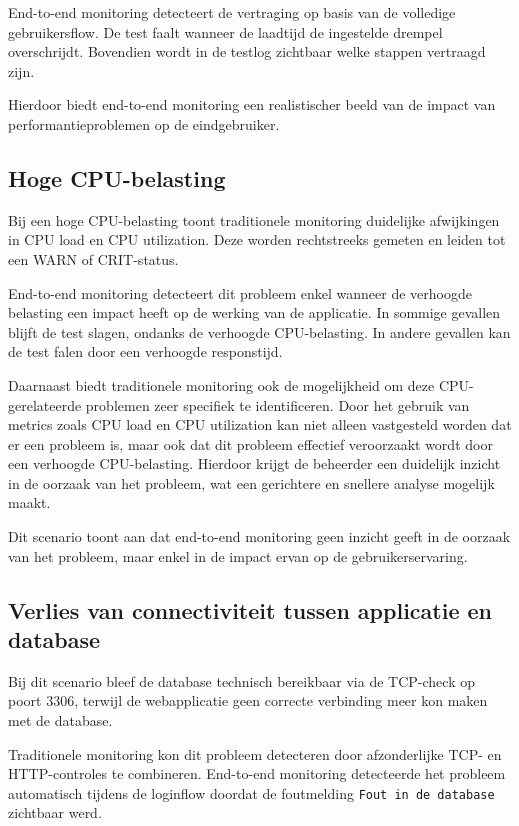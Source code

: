 End-to-end monitoring detecteert de vertraging op basis van de volledige gebruikersflow. De test faalt wanneer de laadtijd de ingestelde drempel overschrijdt. Bovendien wordt in de testlog zichtbaar welke stappen vertraagd zijn.

Hierdoor biedt end-to-end monitoring een realistischer beeld van de impact van performantieproblemen op de eindgebruiker.

\subsection{Hoge CPU-belasting}

Bij een hoge CPU-belasting toont traditionele monitoring duidelijke afwijkingen in CPU load en CPU utilization. Deze worden rechtstreeks gemeten en leiden tot een WARN of CRIT-status.

End-to-end monitoring detecteert dit probleem enkel wanneer de verhoogde belasting een impact heeft op de werking van de applicatie. In sommige gevallen blijft de test slagen, ondanks de verhoogde CPU-belasting. In andere gevallen kan de test falen door een verhoogde responstijd.

Daarnaast biedt traditionele monitoring ook de mogelijkheid om deze CPU-gerelateerde problemen zeer specifiek te identificeren. Door het gebruik van metrics zoals CPU load en CPU utilization kan niet alleen vastgesteld worden dat er een probleem is, maar ook dat dit probleem effectief veroorzaakt wordt door een verhoogde CPU-belasting. Hierdoor krijgt de beheerder een duidelijk inzicht in de oorzaak van het probleem, wat een gerichtere en snellere analyse mogelijk maakt.

Dit scenario toont aan dat end-to-end monitoring geen inzicht geeft in de oorzaak van het probleem, maar enkel in de impact ervan op de gebruikerservaring.

\subsection{Verlies van connectiviteit tussen applicatie en database}

Bij dit scenario bleef de database technisch bereikbaar via de TCP-check op poort 3306, terwijl de webapplicatie geen correcte verbinding meer kon maken met de database.

Traditionele monitoring kon dit probleem detecteren door afzonderlijke TCP- en HTTP-controles te combineren. End-to-end monitoring detecteerde het probleem automatisch tijdens de loginflow doordat de foutmelding \texttt{Fout in de database} zichtbaar werd.

